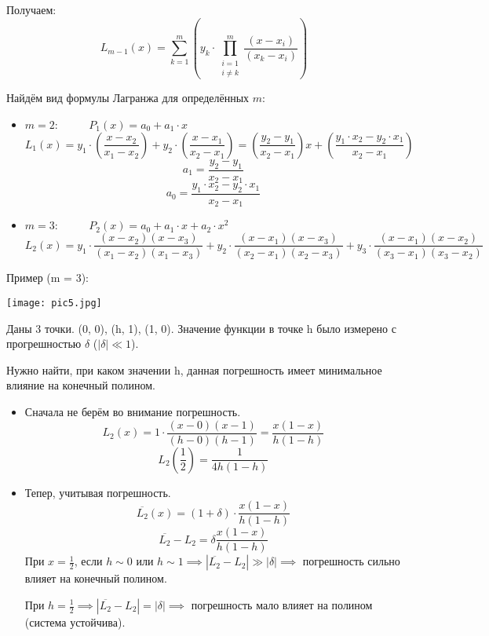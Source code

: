 \documentclass[12pt]{article}
\begin{document}
Получаем:
\[
	L_{m-1}(x) =
	\sum_{k = 1}^{m} \left(y_k \cdot
	\prod_{\substack{i=1 \\ i \neq k}}^{m}
	\frac{(x-x_i)}{(x_k-x_i)}\right)
\]

Найдём вид формулы Лагранжа для определённых \( m \):
\begin{itemize}
	\item \( m = 2: \hspace{32pt} P_1(x) = a_0 + a_1 \cdot x \)
	      \[
		      L_1(x) = y_1 \cdot \left(\frac{x-x_2}{x_1-x_2}\right) +
		      y_2 \cdot \left(\frac{x-x_1}{x_2-x_1}\right) =
		      \left(\frac{y_2-y_1}{x_2 - x_1}\right) x +
		      \left(\frac{y_1 \cdot x_2 - y_2 \cdot x_1}{x_2 - x_1}\right)
	      \]
	      \[ a_1 = \frac{y_2-y_1}{x_2 - x_1} \]
	      \[ a_0 = \frac{y_1 \cdot x_2 - y_2 \cdot x_1}{x_2 - x_1} \]
	\item \( m = 3: \hspace{32pt} P_2(x) = a_0 + a_1 \cdot x + a_2 \cdot x^2 \)
	      \[
		      L_2(x) = y_1 \cdot \frac{(x-x_2)(x-x_3)}{(x_1-x_2)(x_1-x_3)} +
		      y_2 \cdot \frac{(x-x_1)(x-x_3)}{(x_2-x_1)(x_2-x_3)} +
		      y_3 \cdot \frac{(x-x_1)(x-x_2)}{(x_3-x_1)(x_3-x_2)}
	      \]
\end{itemize}

Пример (m = 3):

\vspace{4pt}

\texttt{[image: pic5.jpg]}

Даны 3 точки. (0, 0), (h, 1), (1, 0).
Значение функции в точке h было измерено с прогрешностью \( \delta \)
(\( |\delta| \ll 1 \)).

Нужно найти, при каком значении h, данная погрешность имеет минимальное
влияние на конечный полином.

\begin{itemize}
	\item Сначала не берём во внимание погрешность.
	      \[
		      L_2(x) = 1 \cdot \frac{(x-0)(x-1)}{(h-0)(h-1)} = \frac{x(1-x)}{h(1-h)}
	      \]
	      \[
		      L_2\left(\frac{1}{2}\right) = \frac{1}{4h(1-h)}
	      \]
	\item Тепер, учитывая погрешность.
	      \[
		      \overline{L_2}(x) = (1 + \delta) \cdot
		      \frac{x(1-x)}{h(1-h)}
	      \]
	      \[
		      \overline{L_2} - L_2 = \delta \frac{x(1-x)}{h(1-h)}
	      \]
	      При \( x = \frac{1}{2} \), если \( h \sim 0 \) или \( h \sim 1 \implies
	      |\overline{L_2} - L_2| \gg |\delta| \implies \) погрешность сильно
	      влияет на конечный полином.

	      При \( h = \frac{1}{2} \implies |\overline{L_2} - L_2| = |\delta|
	      \implies \) погрешность мало влияет на полином (система устойчива).
\end{itemize}
\end{document}
